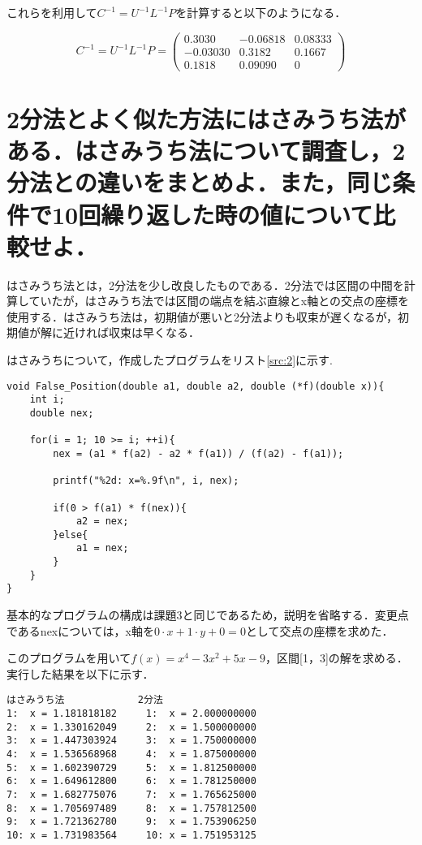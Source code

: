 \documentclass[dvipdfmx,titlepage]{jsarticle}
\begin{document}
これらを利用して$C^{-1}=U^{-1}L^{-1}P$を計算すると以下のようになる．

\begin{equation*}
	C^{-1}=U^{-1}L^{-1}P = \left(
	\begin{array}{ccc}
		0.3030 & -0.06818 & 0.08333 \\
		-0.03030 & 0.3182 & 0.1667 \\
		0.1818 & 0.09090 & 0
	\end{array}
	\right)
\end{equation*}

\setcounter{section}{1}
\section{2分法とよく似た方法にはさみうち法がある．はさみうち法について調査し，2分法との違いをまとめよ．また，同じ条件で10回繰り返した時の値について比較せよ．}

はさみうち法とは，2分法を少し改良したものである．2分法では区間の中間を計算していたが，はさみうち法では区間の端点を結ぶ直線とx軸との交点の座標を使用する．はさみうち法は，初期値が悪いと2分法よりも収束が遅くなるが，初期値が解に近ければ収束は早くなる．

はさみうちについて，作成したプログラムをリスト\ref{src:2}に示す.

\begin{lstlisting}[caption=False\_Position, label=src:2]
void False_Position(double a1, double a2, double (*f)(double x)){
	int i;
	double nex;

	for(i = 1; 10 >= i; ++i){
		nex = (a1 * f(a2) - a2 * f(a1)) / (f(a2) - f(a1));

		printf("%2d: x=%.9f\n", i, nex);

		if(0 > f(a1) * f(nex)){
			a2 = nex;
		}else{
			a1 = nex;
		}
	}
}
\end{lstlisting}

基本的なプログラムの構成は課題3と同じであるため，説明を省略する．変更点であるnexについては，x軸を$0\cdot x + 1 \cdot y + 0 = 0$として交点の座標を求めた．

このプログラムを用いて$f(x)=x^4-3x^2+5x-9$，区間[1，3]の解を求める．実行した結果を以下に示す．

\begin{verbatim}
はさみうち法    　 　　 　2分法
1:  x = 1.181818182     1:  x = 2.000000000
2:  x = 1.330162049     2:  x = 1.500000000
3:  x = 1.447303924     3:  x = 1.750000000
4:  x = 1.536568968     4:  x = 1.875000000
5:  x = 1.602390729     5:  x = 1.812500000
6:  x = 1.649612800     6:  x = 1.781250000
7:  x = 1.682775076     7:  x = 1.765625000
8:  x = 1.705697489     8:  x = 1.757812500
9:  x = 1.721362780     9:  x = 1.753906250
10: x = 1.731983564     10: x = 1.751953125
\end{verbatim}
\end{document}
